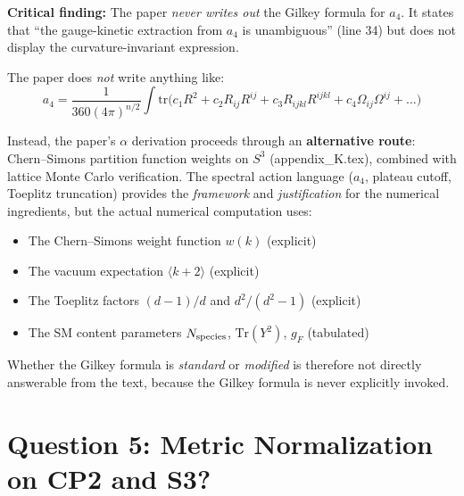 \documentclass[12pt,a4paper]{article}
\begin{document}
\begin{tcolorbox}[colback=yellow!5!white, colframe=yellow!50!black,
  title=Answer: IMPLICIT --- no explicit Gilkey formula is written out]

\textbf{Critical finding:} The paper \emph{never writes out} the
Gilkey formula for $a_4$.  It states that ``the gauge-kinetic extraction
from $a_4$ is unambiguous'' (line 34) but does not display the
curvature-invariant expression.

The paper does \emph{not} write anything like:
\[
a_4 = \frac{1}{360(4\pi)^{n/2}} \int \mathrm{tr}\bigl(
  c_1 R^2 + c_2 R_{ij}R^{ij} + c_3 R_{ijkl}R^{ijkl}
  + c_4 \Omega_{ij}\Omega^{ij} + \ldots\bigr)
\]

Instead, the paper's $\alpha$ derivation proceeds through an
\textbf{alternative route}: Chern--Simons partition function weights
on $S^3$ (appendix\_K.tex), combined with lattice Monte Carlo verification.
The spectral action language ($a_4$, plateau cutoff, Toeplitz truncation)
provides the \emph{framework} and \emph{justification} for the numerical
ingredients, but the actual numerical computation uses:
\begin{itemize}
\item The Chern--Simons weight function $w(k)$ (explicit)
\item The vacuum expectation $\langle k+2 \rangle$ (explicit)
\item The Toeplitz factors $(d-1)/d$ and $d^2/(d^2-1)$ (explicit)
\item The SM content parameters $N_{\rm species}$, $\mathrm{Tr}(Y^2)$, $g_F$ (tabulated)
\end{itemize}

Whether the Gilkey formula is \emph{standard} or \emph{modified} is
therefore not directly answerable from the text, because the Gilkey formula
is never explicitly invoked.
\end{tcolorbox}

\section{Question 5: Metric Normalization on CP2 and S3?}
\label{sec:q5}
\end{document}

